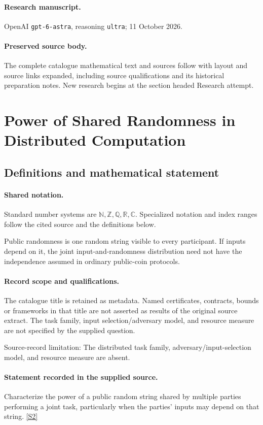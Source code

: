 \documentclass[11pt]{article}
\begin{document}
\paragraph{Research manuscript.} OpenAI \texttt{gpt-6-astra}, reasoning \texttt{ultra}; 11 October 2026.
\paragraph{Preserved source body.} The complete catalogue mathematical text and sources follow with layout and source links expanded, including source qualifications and its historical preparation notes. New research begins at the section headed Research attempt.

\section{Power of Shared Randomness in Distributed Computation}\label{statement}

\subsection{Definitions and mathematical statement}

\paragraph{Shared notation.}Standard number systems are $\mathbb N,\mathbb Z,\mathbb Q,\mathbb R,\mathbb C$. Specialized notation and index ranges follow the cited source and the definitions below.


Public randomness is one random string visible to every participant. If inputs depend on it, the joint input-and-randomness distribution need not have the independence assumed in ordinary public-coin protocols.
\paragraph{Record scope and qualifications.}
The catalogue title is retained as metadata. Named certificates, contracts, bounds or frameworks in that title are not asserted as results of the original source extract.
The task family, input selection/adversary model, and resource measure are not specified by the supplied question.

Source-record limitation: The distributed task family, adversary/input-selection model, and resource measure are absent.
\paragraph{Statement recorded in the supplied source.}
Characterize the power of a public random string shared by multiple parties performing a joint task, particularly when the parties' inputs may depend on that string. \href{https://doi.org/10.4171/owr/2025/3}{[S2]}
\end{document}
